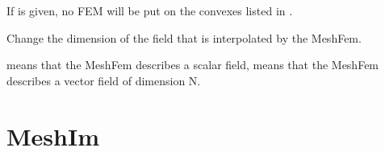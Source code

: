 \documentclass[a4paper,11pt,english]{sphinxmanual}
\begin{document}
\begin{fulllineitems}
\begin{fulllineitems}
If  is given, no FEM will be put on the convexes listed
in .

\end{fulllineitems}


\begin{fulllineitems}
\label{\detokenize{python/cmdref_MeshFem:getfem.MeshFem.set_qdim}}
Change the  dimension of the field that is interpolated by the MeshFem.

 means that the MeshFem describes a scalar field,  means
that the MeshFem describes a vector field of dimension N.

\end{fulllineitems}


\end{fulllineitems}



\section{MeshIm}
\label{\detokenize{python/cmdref_MeshIm:meshim}}\label{\detokenize{python/cmdref_MeshIm::doc}}
\end{document}
